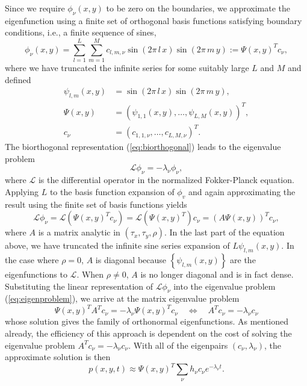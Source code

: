 Since we require $\phi_\nu(x,y)$ to be zero on the boundaries, we
approximate the eigenfunction using a finite set of orthogonal basis
functions satisfying boundary conditions, i.e., a finite sequence of
sines,
\[
  \phi_\nu(x,y) = \sum_{l=1}^L \sum_{m=1}^M c_{l,m, \nu}
  \sin\left(2\pi\, l\, x \right) \sin\left(2\pi\, m\, y \right) := \Psi(x,y)^T c_\nu,
\]
where we have truncated the infinite series for some suitably large
$L$ and $M$ and defined
\begin{align*}
  \psi_{l,m}(x,y) &= \sin\left(2\pi\, l\, x \right)
                         \sin\left(2\pi\, m\, y \right), \\
  \Psi(x,y) &= (\psi_{1,1}(x,y), \ldots, \psi_{L,M}(x,y))^T, \\
  c_\nu &= (c_{1,1,\nu}, \ldots, c_{L,M,\nu})^T.
\end{align*}
The biorthogonal representation (\ref{eq:biorthogonal}) leads to the
eigenvalue problem
\begin{equation}
  \mathcal{L} \phi_\nu = -\lambda_\nu \phi_\nu, \label{eq:eigenproblem}
\end{equation}
where $\mathcal{L}$ is the differential operator in the normalized
Fokker-Planck equation. Applying $L$ to the basis function expansion
of $\phi_v $ and again approximating the result using the finite set
of basis functions yields
\[
  \mathcal{L}\phi_\nu = \mathcal{L}(\Psi(x,y)^T c_\nu) =
  \mathcal{L}(\Psi(x,y)^T) c_\nu = (A \Psi(x,y))^T c_\nu,
\] 
where $A$ is a matrix analytic in $(\tau_x, \tau_y, \rho)$. In the
last part of the equation above, we have truncated the infinite sine
series expansion of $L \psi_{l, m}(x, y)$. In the case where
$\rho = 0$, $A$ is diagonal because $\left\{ \psi_{l,m}(x,y) \right\}$
are the eigenfunctions to $\mathcal{L}$. When $\rho \neq 0$, $A$ is no
longer diagonal and is in fact dense. %
Substituting the linear representation
of $\mathcal{L}\phi_\nu$ into the eigenvalue problem
(\ref{eq:eigenproblem}), we arrive at the matrix eigenvalue problem
\[
  \Psi(x,y)^T A^T c_\nu = -\lambda_\nu \Psi(x,y)^T c_\nu
  \quad \Leftrightarrow \quad A^T c_\nu = -\lambda_\nu c_\nu
\]
whose solution gives the family of orthonormal eigenfunctions. As
mentioned already, the efficiency of this approach is dependent on the
cost of solving the eigenvalue problem
$A^T c_\nu = -\lambda_\nu c_\nu$.  With all of the eigenpairs
$(c_\nu, \lambda_\nu)$, the approximate solution is then
\[
  p(x,y,t) \approx \Psi(x,y)^T \sum_{\nu} h_\nu c_\nu e^{-\lambda_\nu t}.
\]

